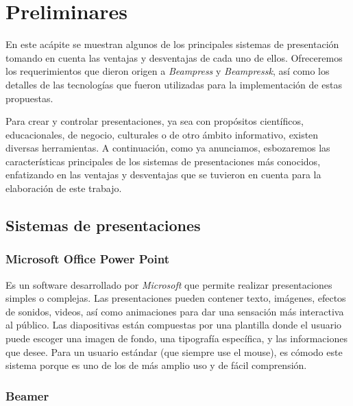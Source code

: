 \chapter{Preliminares} %
\label{cha:preliminares}

	En este acápite se muestran algunos de los principales sistemas de presentación tomando en cuenta las ventajas y desventajas de cada uno de ellos. Ofreceremos los requerimientos que dieron origen a \textit{Beampress} y \textit{Beampressk}, así como los detalles de las tecnologías que fueron utilizadas para la implementación de estas propuestas.

	Para crear y controlar presentaciones, ya sea con propósitos científicos, educacionales, de negocio, culturales o de otro ámbito informativo, existen diversas herramientas. A continuación, como ya anunciamos, esbozaremos las características principales de los sistemas de presentaciones más conocidos, enfatizando en las ventajas y desventajas que se tuvieron en cuenta para la elaboración de este trabajo.	

	\section{Sistemas de presentaciones} %
	\label{sec:sistemas_de_presentaciones}
		\subsection{Microsoft Office Power Point} %
		\label{sub:microsoft_office_power_point}

			Es un software desarrollado por \textit{Microsoft}  que permite realizar presentaciones simples o complejas. Las presentaciones pueden contener texto, imágenes, efectos de sonidos, videos, así como animaciones para dar una sensación más interactiva al público. Las diapositivas están compuestas por una plantilla donde el usuario puede escoger una imagen de fondo, una tipografía específica, y las informaciones que desee. Para un usuario estándar (que siempre use el mouse), es cómodo este sistema porque es uno de los de más amplio uso y de fácil comprensión. 


		\subsection{Beamer} %
		\label{sub:beamer}

